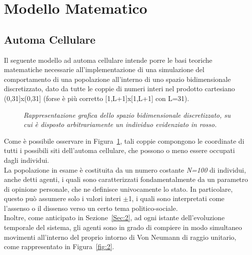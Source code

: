 \documentclass{article}
\begin{document}
\section{Modello Matematico}
\label{Sec:3}

\subsection{Automa Cellulare}
\label{Sec:3.1}
Il seguente modello ad automa cellulare intende porre le basi teoriche matematiche necessarie all'implementazione di una simulazione del comportamento di una popolazione all’interno di uno spazio bidimensionale discretizzato, dato da tutte le coppie di numeri interi nel prodotto cartesiano (0,31]x(0,31] (forse è più corretto [1,L+1]x[1,L+1] con L=31).

\begin{figure}[h]
\centering
{}
\caption{\textit{Rappresentazione grafica dello spazio bidimensionale discretizzato, su cui è disposto arbitrariamente un individuo evidenziato in rosso.}}
\label{fig:1}
\end{figure}

Come è possibile osservare in Figura~\ref{fig:1}, tali coppie compongono le coordinate di tutti i possibili siti dell'automa cellulare, che possono o meno essere occupati dagli individui.
\\ La popolazione in esame è costituita da un numero costante \textit{N=100} di individui, anche detti agenti, i quali sono caratterizzati fondamentalmente da un parametro di opinione personale, che ne definisce univocamente lo stato.
In particolare, questo può assumere solo i valori interi $\pm$1, i quali sono interpretati come l'assenso o il dissenso verso un certo tema politico-sociale.
\bigskip \bigskip
\\ Inoltre, come anticipato in Sezione~\ref{Sec:2}, ad ogni istante dell’evoluzione temporale del sistema, gli agenti sono in grado di compiere in modo simultaneo movimenti all'interno del proprio intorno di Von Neumann di raggio unitario, come rappresentato in Figura~\ref{fig:2}.
\end{document}

